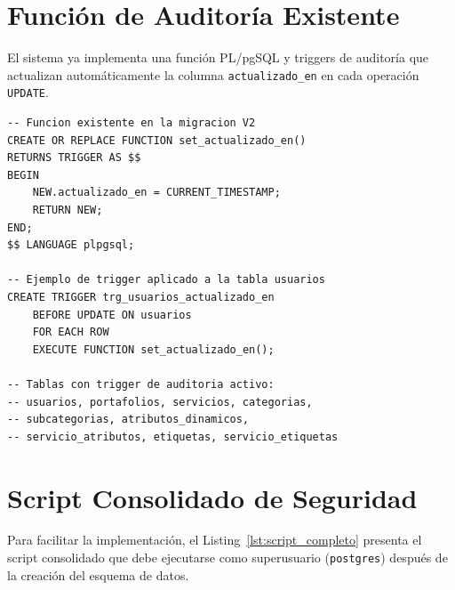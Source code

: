 \documentclass[conference, onecolumn]{IEEEtran}
\begin{document}
\section{Función de Auditoría Existente}

El sistema ya implementa una función PL/pgSQL y triggers de auditoría que actualizan automáticamente la columna \texttt{actualizado\_en} en cada operación \texttt{UPDATE}.

\begin{lstlisting}[caption={Función PL/pgSQL de auditoría existente}, label={lst:funcion_auditoria}]
-- Funcion existente en la migracion V2
CREATE OR REPLACE FUNCTION set_actualizado_en()
RETURNS TRIGGER AS $$
BEGIN
    NEW.actualizado_en = CURRENT_TIMESTAMP;
    RETURN NEW;
END;
$$ LANGUAGE plpgsql;

-- Ejemplo de trigger aplicado a la tabla usuarios
CREATE TRIGGER trg_usuarios_actualizado_en
    BEFORE UPDATE ON usuarios
    FOR EACH ROW
    EXECUTE FUNCTION set_actualizado_en();

-- Tablas con trigger de auditoria activo:
-- usuarios, portafolios, servicios, categorias,
-- subcategorias, atributos_dinamicos,
-- servicio_atributos, etiquetas, servicio_etiquetas
\end{lstlisting}

\section{Script Consolidado de Seguridad}

Para facilitar la implementación, el Listing~\ref{lst:script_completo} presenta el script consolidado que debe ejecutarse como superusuario (\texttt{postgres}) después de la creación del esquema de datos.
\end{document}
